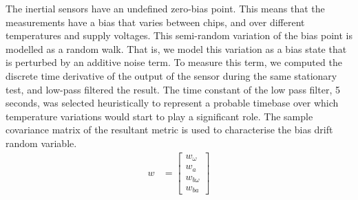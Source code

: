 \documentclass[]{article}
\begin{document}
{The inertial sensors have an undefined zero-bias point. This means that the measurements have a bias that varies between chips, and over different temperatures and supply voltages. This semi-random variation of the bias point is modelled as a random walk. That is, we model this variation as a bias state that is perturbed by an additive noise term.
To measure this term, we computed the discrete time derivative of the output of the sensor during the same stationary test, and low-pass filtered the result. The time constant of the low pass filter, 5 seconds, was selected heuristically to represent a probable timebase over which temperature variations would start to play a significant role. The sample covariance matrix of the resultant metric is used to characterise the bias drift random variable.
\begin{align}
	\label{eqn:proc_noise_def}
	w &= 
	\left[
	\begin{matrix}
		w_\omega \\
		w_a \\
		w_{b\omega} \\
		w_{ba}
	\end{matrix}
	\right]
\end{align}

}
\end{document}
